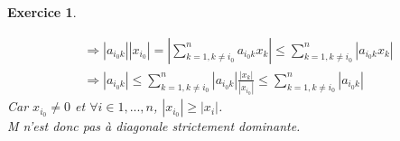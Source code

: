 \documentclass[a4paper,11pt]{article}
\newtheorem{exo}{Exercice}
\newcommand{\abs}[1]{\left\lvert#1\right\rvert}
\begin{document}
\begin{exo}
\begin{enumerate}
\begin{equation}
\begin{aligned}
& \Rightarrow \abs{a_{i_0k}}\abs{x_{i_0}} = \abs{\sum\limits_{k=1,k\neq i_0}^n a_{i_0k}x_k} \le \sum\limits_{k=1,k\neq i_0}^n \abs{a_{i_0k}x_k} \ \\
& \Rightarrow \abs{a_{i_0k}} \le \sum\limits_{k=1,k\neq i_0}^n \abs{a_{i_0k}}\frac{\abs{x_{k}}}{\abs{x_{i_0}}}  \le \sum\limits_{k=1,k\neq i_0}^n \abs{a_{i_0k}}
\end{aligned}
\end{equation}
Car $x_{i_0} \ne 0 $ et  $\forall i \in 1,...,n$, $\abs{x_{i_0}} \ge \abs{x_i}$. \ \\
{\it M} n'est donc pas à diagonale strictement dominante.
\end{enumerate}
\end{exo}

\end{document}
